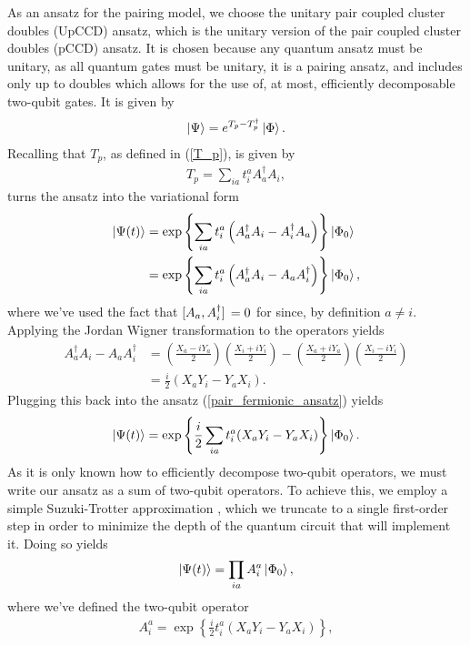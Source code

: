 \documentclass[10pt]{article}
\begin{document}
As an ansatz for the pairing model, we choose the unitary pair coupled cluster doubles (UpCCD) ansatz, which is the unitary version of the pair coupled cluster doubles (pCCD) ansatz. It is chosen because any quantum ansatz must be unitary, as all quantum gates must be unitary, it is a pairing ansatz, and includes only up to doubles which allows for the use of, at most, efficiently decomposable two-qubit gates. It is given by
\begin{align}
\ket{\Psi}=e^{T_p-T^\dagger_p}\ket{\Phi}.
\end{align}
Recalling that $T_p$, as defined in (\ref{T_p}), is given by
\begin{align}
T_p=\sum_{ia}t^a_iA^\dagger_aA_i,
\end{align}
turns the ansatz into the variational form
\begin{align}
\label{pair_fermionic_ansatz}
\ket{\Psi(t)}
&=\exp\left\{\sum_{ia}t^a_i\left(A^\dagger_aA_i-A^\dagger_iA_a\right)\right\}\ket{\Phi_0}
\\
&=\exp\left\{\sum_{ia}t^a_i\left(A^\dagger_aA_i-A_aA^\dagger_i\right)\right\}\ket{\Phi_0},
\end{align}
where we've used the fact that $\comm*{A_a}{A^\dagger_i}=0$ for since, by definition $a\neq i$. Applying the Jordan Wigner transformation to the operators yields
\begin{align}
A_a^{\dagger}A_i-A_aA_i^{\dagger}
&=
\left(\frac{X_a-iY_a}{2}\right)\left(\frac{X_i+iY_i}{2}\right)
-
\left(\frac{X_a+iY_a}{2}\right)\left(\frac{X_i-iY_i}{2}\right)
\\
&=
\frac{i}{2}(X_aY_i-Y_aX_i).
\end{align}
Plugging this back into the ansatz (\ref{pair_fermionic_ansatz}) yields
\begin{align}
\label{pairing_pauli_ansatz}
\ket{\Psi(t)}
=
\exp\left\{\frac{i}{2}\sum_{ia}t^a_i(X_aY_i-Y_aX_i)\right\}\ket{\Phi_0}.
\end{align}
As it is only known how to efficiently decompose two-qubit operators, we must write our ansatz as a sum of two-qubit operators. To achieve this, we employ a simple Suzuki-Trotter approximation \cite{ref:trotter}, which we truncate to a single first-order step in order to minimize the depth of the quantum circuit that will implement it. Doing so yields
\begin{align}
\label{pairing_trott_ansatz}
\ket{{\Psi}(t)}
=
\prod_{ia}A^a_i\ket{\Phi_0},
\end{align}
where we've defined the two-qubit operator
\begin{align}
\label{aia}
A_i^a=\exp\left\{\frac{i}{2}t^a_i(X_aY_i-Y_aX_i)\right\}
,\end{align}
\end{document}
